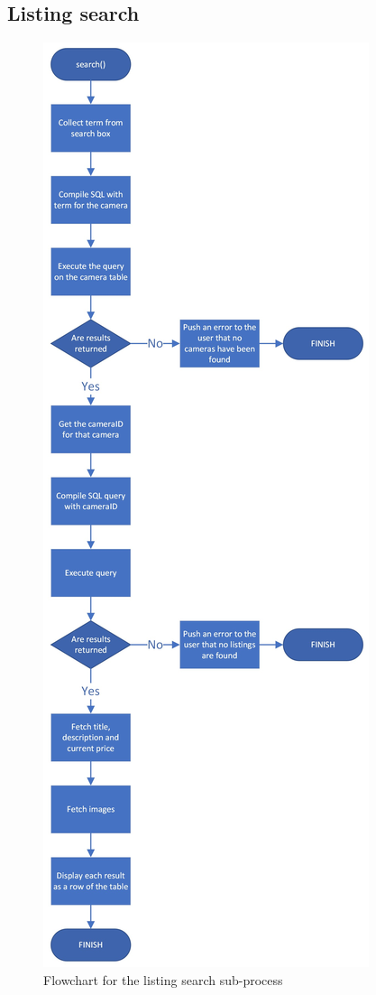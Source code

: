  \subsection{Listing search}
 \begin{figure}[H]
     \centering
     \includegraphics[scale=0.3]{ch2_design/c3_search2.jpeg}
     \caption{Flowchart for the listing search sub-process}
     \label{fig:flow_search}
 \end{figure}
